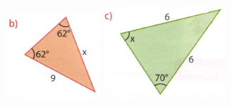 \documentclass[a4paper,14pt]{article}
\begin{document}
\begin{multicols}{2}
\begin{enumerate}
			\includegraphics[width=1\linewidth]{6FMA124_imagens/imagem2}
			\includegraphics[width=1\linewidth]{6FMA124_imagens/imagem3}

\end{enumerate}
\end{multicols}
\end{document}

